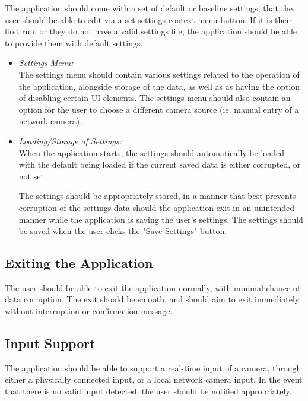 \documentclass[conference]{IEEEtran}
\begin{document}
The application should come with a set of default or baseline settings, that the user should be able to edit via a set settings context menu button. If it is their first run, or they do not have a valid settings file, the application should be able to provide them with default settings.
\newline
\begin{itemize}
\item{\emph{Settings Menu:}}\\
The settings menu should contain various settings related to the operation of the application, alongside storage of the data, as well as as having the option of disabling certain UI elements. The settings menu should also contain an option for the user to choose a different camera source (ie. manual entry of a network camera).
\newline

\item{\emph{Loading/Storage of Settings:}}\\
When the application starts, the settings should automatically be loaded - with the default being loaded if the current saved data is either corrupted, or not set. 

The settings should be appropriately stored, in a manner that best prevents corruption of the settings data should the application exit in an unintended manner while the application is saving the user's settings. The settings should be saved when the user clicks the "Save Settings" button.
\newline
\end{itemize}

\subsection{Exiting the Application}
The user should be able to exit the application normally, with minimal chance of data corruption. The exit should be smooth, and should aim to exit immediately without interruption or confirmation message.
\newline
\subsection{Input Support}

The application should be able to support a real-time input of a camera, through either a physically connected input, or a local network camera input. In the event that there is no valid input detected, the user should be notified appropriately. 
\newline
\end{document}
